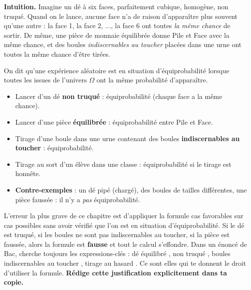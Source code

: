 \documentclass[11pt]{article}
\newcommand{\cle}[1]{{\popxbold\color{popdark}#1}}
\newcounter{popsec}
\newcounter{popsub}
\newcommand{\courssub}[1]{%
  \stepcounter{popsub}%
  \par\vspace{9pt}\noindent{\popxbold\fontsize{11.5}{13}\selectfont\color{popink}{\color{poporange}\thepopsec.\thepopsub}\hspace{6pt}#1}\par\nopagebreak\vspace{4pt}
}
\begin{document}
\courssub{La situation d'équiprobabilité}

\textbf{Intuition.} Imagine un dé à six faces, parfaitement cubique, homogène, non truqué. Quand on le lance, aucune face n'a de raison d'apparaître plus souvent qu'une autre : la face 1, la face 2, ..., la face 6 ont toutes \emph{la même chance} de sortir. De même, une pièce de monnaie équilibrée donne Pile et Face avec la même chance, et des boules \emph{indiscernables au toucher} placées dans une urne ont toutes la même chance d'être tirées.

\begin{definition}[Équiprobabilité]
On dit qu'une expérience aléatoire est en situation d'\cle{équiprobabilité} lorsque toutes les issues de l'univers $\Omega$ ont la même probabilité d'apparaître.
\end{definition}

\begin{exemplebox}
\begin{itemize}
\item Lancer d'un dé \textbf{non truqué} : équiprobabilité (chaque face a la même chance).
\item Lancer d'une pièce \textbf{équilibrée} : équiprobabilité entre Pile et Face.
\item Tirage d'une boule dans une urne contenant des boules \textbf{indiscernables au toucher} : équiprobabilité.
\item Tirage au sort d'un élève dans une classe : équiprobabilité si le tirage est honnête.
\item \textbf{Contre-exemples} : un dé pipé (chargé), des boules de tailles différentes, une pièce faussée : il n'y a \emph{pas} équiprobabilité.
\end{itemize}
\end{exemplebox}

\begin{attention}
L'erreur la plus grave de ce chapitre est d'appliquer la formule \og cas favorables sur cas possibles \fg{} sans avoir vérifié que l'on est en situation d'équiprobabilité. Si le dé est truqué, si les boules ne sont pas indiscernables au toucher, si la pièce est faussée, alors la formule est \textbf{fausse} et tout le calcul s'effondre. Dans un énoncé de Bac, cherche toujours les expressions-clés : \og dé équilibré \fg, \og non truqué \fg, \og boules indiscernables au toucher \fg, \og tirage au hasard \fg. Ce sont elles qui te donnent le droit d'utiliser la formule. \textbf{Rédige cette justification explicitement dans ta copie.}
\end{attention}
\end{document}
